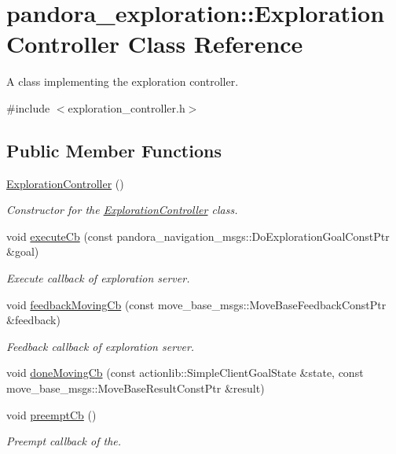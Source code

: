 \hypertarget{classpandora__exploration_1_1_exploration_controller}{\section{pandora\-\_\-exploration\-:\-:\-Exploration\-Controller \-Class \-Reference}
\label{classpandora__exploration_1_1_exploration_controller}
}


\-A class implementing the exploration controller.  




{\ttfamily \#include $<$exploration\-\_\-controller.\-h$>$}

\subsection*{\-Public \-Member \-Functions}
\begin{DoxyCompactItemize}
\item 
\hyperlink{classpandora__exploration_1_1_exploration_controller_a643fe0579b7da60edee7bdd5cce72568}{\-Exploration\-Controller} ()
\begin{DoxyCompactList}\small\item\em \-Constructor for the \hyperlink{classpandora__exploration_1_1_exploration_controller}{\-Exploration\-Controller} class. \end{DoxyCompactList}\item 
void \hyperlink{classpandora__exploration_1_1_exploration_controller_a08e422841c77fe275ce1fc29614c46c7}{execute\-Cb} (const pandora\-\_\-navigation\-\_\-msgs\-::\-Do\-Exploration\-Goal\-Const\-Ptr \&goal)
\begin{DoxyCompactList}\small\item\em \-Execute callback of exploration server. \end{DoxyCompactList}\item 
void \hyperlink{classpandora__exploration_1_1_exploration_controller_a9b8622e656ef06842eb26c0d42ea3568}{feedback\-Moving\-Cb} (const move\-\_\-base\-\_\-msgs\-::\-Move\-Base\-Feedback\-Const\-Ptr \&feedback)
\begin{DoxyCompactList}\small\item\em \-Feedback callback of exploration server. \end{DoxyCompactList}\item 
void \hyperlink{classpandora__exploration_1_1_exploration_controller_a26044d356a83075342e10ea7818b4f1e}{done\-Moving\-Cb} (const actionlib\-::\-Simple\-Client\-Goal\-State \&state, const move\-\_\-base\-\_\-msgs\-::\-Move\-Base\-Result\-Const\-Ptr \&result)
\item 
void \hyperlink{classpandora__exploration_1_1_exploration_controller_aa22e459343ade439e1e52aa3031f686e}{preempt\-Cb} ()
\begin{DoxyCompactList}\small\item\em \-Preempt callback of the. \end{DoxyCompactList}\end{DoxyCompactItemize}


